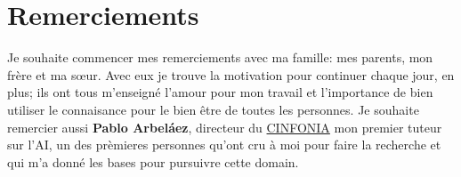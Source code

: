 \chapter*{Remerciements}
\noindent Je souhaite commencer mes remerciements avec ma famille: mes parents, mon frère et ma s\oe ur. Avec 
eux je trouve la motivation pour continuer chaque jour, en plus; ils ont tous m'enseigné l'amour pour 
mon travail et l'importance de bien utiliser le connaisance pour le bien être de toutes les personnes. 
Je souhaite remercier aussi \textbf{Pablo Arbeláez}, directeur du \href{https://cinfonia.uniandes.edu.co/}{CINFONIA} 
mon premier tuteur sur l'AI, un des prèmieres personnes qu'ont cru à moi pour faire la recherche et qui m'a 
donné les bases pour pursuivre cette domain. 

